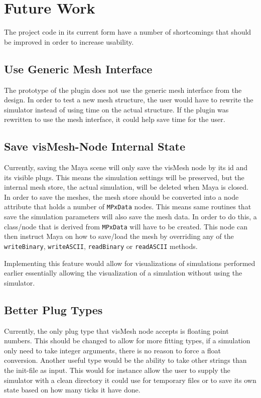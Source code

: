 \section{Future Work}
\label{sec:future}
The project code in its current form have a number of shortcomings that should
be improved in order to increase usability.

\subsection{Use Generic Mesh Interface}
The prototype of the plugin does not use the generic mesh interface from the
design. In order to test a new mesh structure, the user would have to rewrite the
simulator instead of using time on the actual structure. If the plugin was
rewritten to use the mesh interface, it could help save time for the user.

\subsection{Save visMesh-Node Internal State}
Currently, saving the Maya scene will only save the visMesh node by its id and
its visible plugs. This means the simulation settings will be preserved, but the internal
mesh store, the actual simulation, will be deleted when Maya is closed. In order
to save the meshes, the mesh store should be converted into a node attribute that holds
a number of \texttt{MPxData} nodes. This means same routines that save the
simulation parameters will also save the mesh data. In order to do this, a
class/node that is derived from \texttt{MPxData} will have to be created. This
node can then instruct Maya on how to save/load the mesh by overriding any of
the \texttt{writeBinary}, \texttt{writeASCII}, \texttt{readBinary} or
\texttt{readASCII} methods.

Implementing this feature would allow for visualizations of simulations
performed earlier essentially allowing the visualization of a simulation without
using the simulator.

\subsection{Better Plug Types}
Currently, the only plug type that visMesh node accepts is floating point
numbers. This should be changed to allow for more fitting types, if a simulation
only need to take integer arguments, there is no reason to force a float
conversion. Another useful type would be the ability to take other strings than
the init-file as input. This would for instance allow the user to supply the
simulator with a clean directory it could use for temporary files or to save its
own state based on how many ticks it have done.

